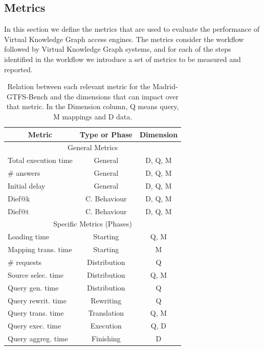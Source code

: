 \subsection{Metrics}
In this section we define the metrics that are used to evaluate the performance of Virtual Knowledge Graph access engines. The metrics consider the workflow followed by Virtual Knowledge Graph systems, and for each of the steps identified in the workflow we introduce a set of metrics to be measured and reported.
\begin{table}[]
\caption{Relation between each relevant metric for the Madrid-GTFS-Bench and the dimensions that can impact over that metric. In the Dimension column, Q means query, M mappings and D data.}
\label{tab:dimsensions}
\begin{tabular}{l|c|c}
\hline
\multicolumn{1}{c|}{\textbf{Metric}} & \textbf{Type or Phase} & \textbf{Dimension}  \\ \hline
\multicolumn{3}{c}{General Metrics}                                                 \\ \hline
Total execution time                & General                & D, Q, M \\ \hline
\# answers                            & General                & D, Q, M \\ \hline
Initial delay                         & General                & D, Q, M \\ \hline
Dief@k                                & C. Behaviour           & D, Q, M \\ \hline
Dief@t                                & C. Behaviour           & D, Q, M \\ \hline
\multicolumn{3}{c}{Specific Metrics (Phases)}                                       \\ \hline
Loading time                          & Starting        & Q, M      \\ \hline
Mapping trans. time              & Starting         & M              \\ \hline
\# requests                           & Distribution      & Q              \\ \hline
Source selec. time                 & Distribution      & Q, M     \\ \hline
Query gen. time                 & Distribution      & Q               \\ \hline
Query rewrit. time                  & Rewriting     & Q                \\ \hline
Query trans. time                & Translation    & Q, M       \\ \hline
Query exec. time                  & Execution     & Q, D          \\ \hline
Query aggreg. time                & Finishing         & D                 \\ \hline
\end{tabular}
\end{table}

